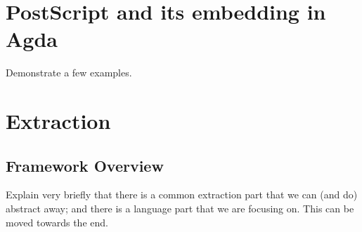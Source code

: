 \documentclass[sigplan,anonymous,review]{acmart}
\begin{document}
%



\section{PostScript and its embedding in Agda}
Demonstrate a few examples.

\section{Extraction}
\subsection{Framework Overview}
Explain very briefly that there is a common extraction part that we can (and do)
abstract away; and there is a language part that we are focusing on.  This can be
moved towards the end.
\end{document}
